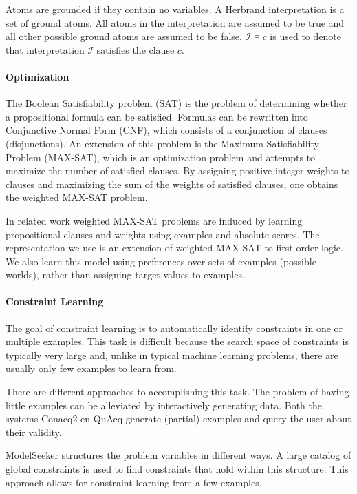 \documentclass[letterpaper]{article}
\newcommand{\sym}[1]{\ensuremath{\mathcal{#1}}}
\theoremstyle{definition}
\begin{document}
Atoms are grounded if they contain no variables.
A Herbrand interpretation is a set of ground atoms.
All atoms in the interpretation are assumed to be true and all other possible ground atoms are assumed to be false.
$\sym{I} \models c$ is used to denote that interpretation \sym{I} satisfies the clause $c$.

\paragraph{Optimization}
The Boolean Satisfiability problem (SAT) is the problem of determining whether a propositional formula can be satisfied.
Formulas can be rewritten into Conjunctive Normal Form (CNF), which consists of a conjunction of clauses (disjunctions).
An extension of this problem is the Maximum Satisfiability Problem (MAX-SAT), which is an optimization problem and attempts to maximize the number of satisfied clauses.
By assigning positive integer weights to clauses and maximizing the sum of the weights of satisfied clauses, one obtains the weighted MAX-SAT problem.

In related work \cite{campigotto2011active} weighted MAX-SAT problems are induced by learning propositional clauses and weights using examples and absolute scores.
The representation we use is an extension of weighted MAX-SAT to first-order logic.
We also learn this model using preferences over sets of examples (possible worlds), rather than assigning target values to examples.

\paragraph{Constraint Learning}
The goal of constraint learning is to automatically identify constraints in one or multiple examples.
This task is difficult because the search space of constraints is typically very large and, unlike in typical machine learning problems, there are usually only few examples to learn from.

There are different approaches to accomplishing this task.
The problem of having little examples can be alleviated by interactively generating data.
Both the systems Conacq2 \cite{bessiere2007query} en QuAcq \cite{bessiere2013constraint} generate (partial) examples and query the user about their validity.

ModelSeeker \cite{Beldiceanu:ModelSeeker} structures the problem variables in different ways.
A large catalog of global constraints is used to find constraints that hold within this structure.
This approach allows for constraint learning from a few examples.
\end{document}
